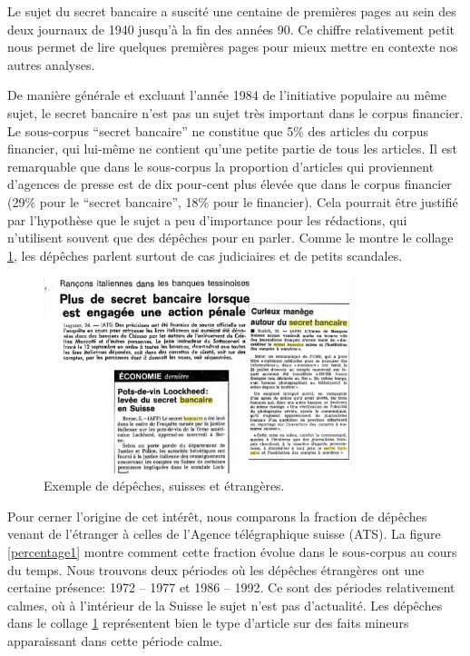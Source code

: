 \documentclass[11pt]{article}
\begin{document}
Le sujet du secret bancaire a suscité une centaine de premières pages au
sein des deux journaux de 1940 jusqu'à la fin des années 90. Ce chiffre
relativement petit nous permet de lire quelques premières pages pour
mieux mettre en contexte nos autres analyses.

De manière générale et excluant l'année 1984 de l'initiative populaire
au même sujet, le secret bancaire n'est pas un sujet très important dans
le corpus financier. Le sous-corpus ``secret bancaire'' ne constitue que
5\% des articles du corpus financier, qui lui-même ne contient qu'une
petite partie de tous les articles. Il est remarquable que dans le
sous-corpus la proportion d'articles qui proviennent d'agences de presse
est de dix pour-cent plus élevée que dans le corpus financier (29\% pour
le ``secret bancaire'', 18\% pour le financier). Cela pourrait être
justifié par l'hypothèse que le sujet a peu d'importance pour les
rédactions, qui n'utilisent souvent que des dépêches pour en parler.
Comme le montre le collage \ref{depeches}, les dépêches parlent surtout
de cas judiciaires et de petits scandales.

\begin{figure}
\centering
\includegraphics[width=0.8\textwidth ]{analysis/agencies_collage.png}
\caption{\label{depeches} Exemple de dépêches, suisses et étrangères.}
\end{figure}

Pour cerner l'origine de cet intérêt, nous comparons la fraction de
dépêches venant de l'étranger à celles de l'Agence télégraphique suisse
(ATS). La figure \ref{percentage1} montre comment cette fraction évolue
dans le sous-corpus au cours du temps. Nous trouvons deux périodes où
les dépêches étrangères ont une certaine présence: 1972 -- 1977 et 1986
-- 1992. Ce sont des périodes relativement calmes, où à l'intérieur de
la Suisse le sujet n'est pas d'actualité. Les dépêches dans le collage
\ref{depeches} représentent bien le type d'article sur des faits mineurs
apparaissant dans cette période calme.
\end{document}

